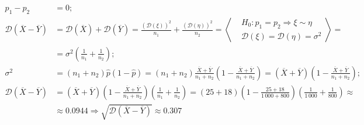 \documentclass[12pt, a4paper]{article}
\newcommand{\dev}{\mathcal{D}}
\begin{document}
\begin{equation*}
    \begin{aligned}
        p_1 - p_2                                      & = 0;                                                                                                                                                                                                                                                                                   \\
        \dev(\overline{X} - \overline{Y})              & = \dev(\overline{X}) + \dev(\overline{Y}) = \frac{\left( \dev (\xi) \right)^2}{n_1} + \frac{\left( \dev (\eta) \right)^2}{n_2} = \left< \begin{aligned}
                                                                                                                                                                                                      & H_0: p_1 = p_2\Rightarrow \xi \sim \eta \\
                                                                                                                                                                                                      & \dev(\xi) = \dev(\eta) = \sigma^2
                                                                                                                                                                                                 \end{aligned} \right> =                                                                                                     \\
                                                       & =\sigma^2\left( \frac{1}{n_1} + \frac{1}{n_2} \right);                                                                                                                                                                                                                                 \\
        \sigma^2                                       & = (n_1 + n_2) \hat p \left( 1 - \hat p \right) = (n_1 + n_2)\frac{\overline{X} + \overline{Y}}{n_1 + n_2} \left( 1 - \frac{\overline{X} + \overline{Y}}{n_1 + n_2} \right) = \left(\overline{X} + \overline{Y}\right)\left( 1 - \frac{\overline{X} + \overline{Y}}{n_1 + n_2} \right); \\
        \dev\left( \overline{X} - \overline{Y} \right) & = \left( \overline{X} + \overline{Y} \right)\left( 1 - \frac{\overline{X} + \overline{Y}}{n_1 + n_2} \right)\left( \frac{1}{n_1} + \frac{1}{n_2} \right) = (25 + 18)\left( 1 - \frac{25 + 18}{1\,000 + 800} \right)\left( \frac{1}{1\,000} + \frac{1}{800} \right) \approx             \\
                                                       & \approx 0.0944 \Rightarrow \sqrt{\dev\left( \overline{X} - \overline{Y} \right)} \approx 0.307
    \end{aligned}
\end{equation*}
\end{document}
